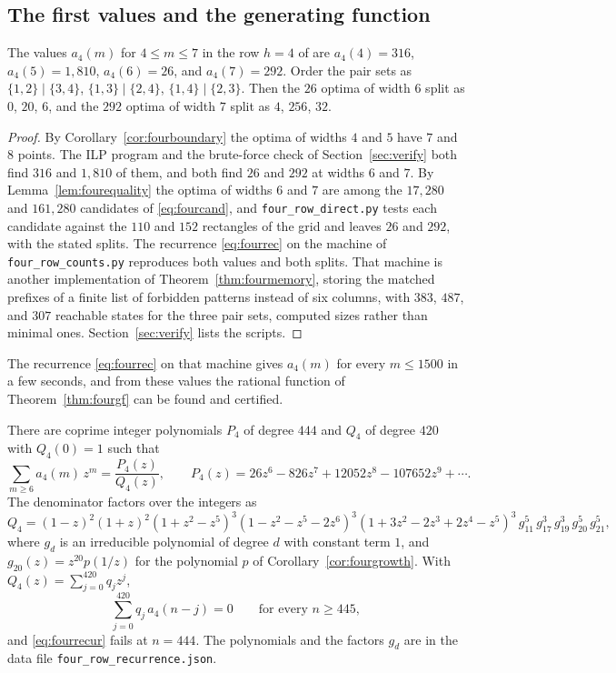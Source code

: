 \subsection{The first values and the generating function}

\begin{proposition}\label{prop:fourvalues}
The values $a_4(m)$ for $4\le m\le7$ in the row $h=4$ of  are $a_4(4)=316$, $a_4(5)=1{,}810$, $a_4(6)=26$, and $a_4(7)=292$. Order the pair sets as $\{1,2\}\mid\{3,4\}$, $\{1,3\}\mid\{2,4\}$, $\{1,4\}\mid\{2,3\}$. Then the $26$ optima of width $6$ split as $0$, $20$, $6$, and the $292$ optima of width $7$ split as $4$, $256$, $32$.
\end{proposition}

\begin{proof}
By Corollary~\ref{cor:fourboundary} the optima of widths $4$ and $5$ have $7$ and $8$ points. The ILP program and the brute-force check of Section~\ref{sec:verify} both find $316$ and $1{,}810$ of them, and both find $26$ and $292$ at widths $6$ and $7$. By Lemma~\ref{lem:fourequality} the optima of widths $6$ and $7$ are among the $17{,}280$ and $161{,}280$ candidates of \eqref{eq:fourcand}, and \texttt{four\_row\_direct.py} tests each candidate against the $110$ and $152$ rectangles of the grid and leaves $26$ and $292$, with the stated splits. The recurrence \eqref{eq:fourrec} on the machine of \texttt{four\_row\_counts.py} reproduces both values and both splits. That machine is another implementation of Theorem~\ref{thm:fourmemory}, storing the matched prefixes of a finite list of forbidden patterns instead of six columns, with $383$, $487$, and $307$ reachable states for the three pair sets, computed sizes rather than minimal ones. Section~\ref{sec:verify} lists the scripts.
\end{proof}

The recurrence \eqref{eq:fourrec} on that machine gives $a_4(m)$ for every $m\le1500$ in a few seconds, and from these values the rational function of Theorem~\ref{thm:fourgf} can be found and certified.

\begin{theorem}\label{thm:fourgfexact}
There are coprime integer polynomials $P_4$ of degree $444$ and $Q_4$ of degree $420$ with $Q_4(0)=1$ such that
\[
\sum_{m\ge6}a_4(m)\,z^m=\frac{P_4(z)}{Q_4(z)},\qquad P_4(z)=26z^6-826z^7+12052z^8-107652z^9+\cdots .
\]
The denominator factors over the integers as
\[
Q_4=(1-z)^2(1+z)^2(1+z^2-z^5)^3(1-z^2-z^5-2z^6)^3(1+3z^2-2z^3+2z^4-z^5)^3\,g_{11}^5\,g_{17}^3\,g_{19}^3\,g_{20}^5\,g_{21}^5,
\]
where $g_d$ is an irreducible polynomial of degree $d$ with constant term $1$, and $g_{20}(z)=z^{20}p(1/z)$ for the polynomial $p$ of Corollary~\ref{cor:fourgrowth}. With $Q_4(z)=\sum_{j=0}^{420}q_jz^j$,
\begin{equation}\label{eq:fourrecur}
\sum_{j=0}^{420}q_j\,a_4(n-j)=0\qquad\text{for every }n\ge445,
\end{equation}
and \eqref{eq:fourrecur} fails at $n=444$. The polynomials and the factors $g_d$ are in the data file \texttt{four\_row\_recurrence.json}.
\end{theorem}

